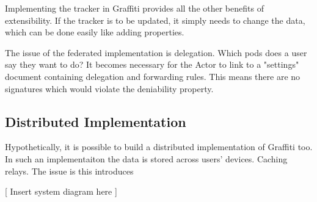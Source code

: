 Implementing the tracker in Graffiti provides all the other benefits of extensibility.
If the tracker is to be updated, it simply needs to change the data,
which can be done easily like adding properties.

The issue of the federated implementation is delegation.
Which pods does a user say they want to do?
It becomes necessary for the Actor to link to a "settings" document
containing delegation and forwarding rules.
This means there are no signatures which would violate the deniability property.

\subsection{Distributed Implementation}

Hypothetically, it is possible to build a distributed implementation of Graffiti too.
In such an implementaiton the data is stored across users' devices.
Caching relays.
The issue is this introduces

[ Insert system diagram here ]






